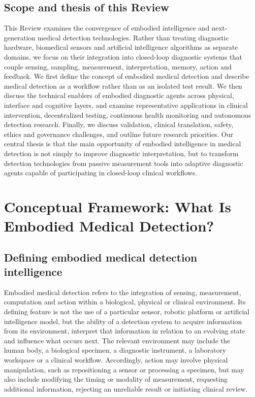 \documentclass[12pt,a4paper]{article}
\newif\ifshowplaceholders
\newcommand{\outlineplaceholder}{%
\ifshowplaceholders
\par\noindent\textit{[Content to be developed.]}\par\medskip
\fi
}
\begin{document}
\subsection{Scope and thesis of this Review}
\label{subsec:scope_thesis}

This Review examines the convergence of embodied intelligence and next-generation medical detection technologies. Rather than treating diagnostic hardware, biomedical sensors and artificial intelligence algorithms as separate domains, we focus on their integration into closed-loop diagnostic systems that couple sensing, sampling, measurement, interpretation, memory, action and feedback. We first define the concept of embodied medical detection and describe medical detection as a workflow rather than as an isolated test result. We then discuss the technical enablers of embodied diagnostic agents across physical, interface and cognitive layers, and examine representative applications in clinical intervention, decentralized testing, continuous health monitoring and autonomous detection research. Finally, we discuss validation, clinical translation, safety, ethics and governance challenges, and outline future research priorities. Our central thesis is that the main opportunity of embodied intelligence in medical detection is not simply to improve diagnostic interpretation, but to transform detection technologies from passive measurement tools into adaptive diagnostic agents capable of participating in closed-loop clinical workflows.


\section{Conceptual Framework: What Is Embodied Medical Detection?}
\label{sec:conceptual_framework}

\subsection{Defining embodied medical detection intelligence}
\label{subsec:defining_embodied_medical_detection}
Embodied medical detection refers to the integration of sensing, measurement, computation and action within a biological, physical or clinical environment. Its defining feature is not the use of a particular sensor, robotic platform or artificial intelligence model, but the ability of a detection system to acquire information from its environment, interpret that information in relation to an evolving state and influence what occurs next. The relevant environment may include the human body, a biological specimen, a diagnostic instrument, a laboratory workspace or a clinical workflow. Accordingly, action may involve physical manipulation, such as repositioning a sensor or processing a specimen, but may also include modifying the timing or modality of measurement, requesting additional information, rejecting an unreliable result or initiating clinical review.
\end{document}

